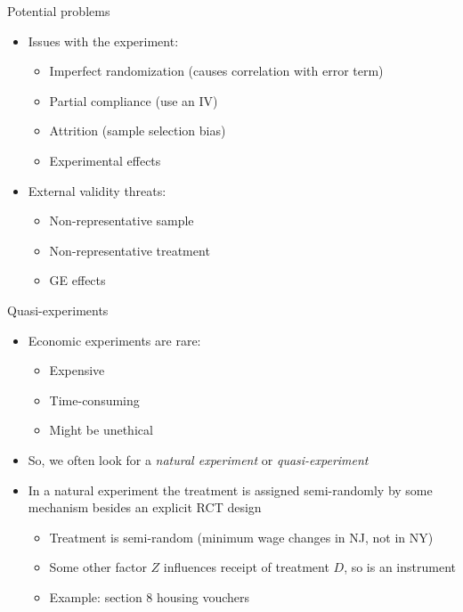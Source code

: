 \documentclass[aspectratio=169]{beamer}
\begin{document}
\begin{frame}{Potential problems}
    \begin{itemize}
        \item Issues with the experiment:
        \begin{itemize}
            \item Imperfect randomization (causes correlation with error term)
            \item Partial compliance (use an IV)
            \item Attrition (sample selection bias)
            \item Experimental effects
        \end{itemize}
        \item External validity threats:
        \begin{itemize}
            \item Non-representative sample
            \item Non-representative treatment  
            \item GE effects
        \end{itemize}
    \end{itemize}
\end{frame}

\begin{frame}{Quasi-experiments}
    \begin{itemize}
        \item Economic experiments are rare:
        \begin{itemize}
            \item Expensive
            \item Time-consuming
            \item Might be unethical
        \end{itemize}
        \item So, we often look for a \textit{natural experiment} or \textit{quasi-experiment}
        \item In a natural experiment the treatment is assigned semi-randomly by some mechanism besides an explicit RCT design
        \begin{itemize}
            \item Treatment is semi-random (minimum wage changes in NJ, not in NY)
            \item Some other factor $Z$ influences receipt of treatment $D$, so is an instrument
            \item Example: section 8 housing vouchers
        \end{itemize}
    \end{itemize}
\end{frame}
\end{document}
